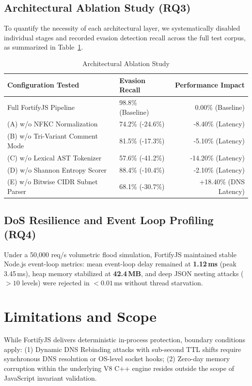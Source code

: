 \documentclass[conference]{IEEEtran}
\begin{document}
\subsection{Architectural Ablation Study (RQ3)}
To quantify the necessity of each architectural layer, we systematically disabled individual stages and recorded evasion detection recall across the full test corpus, as summarized in Table~\ref{tab:ablation}.

\begin{table}[htbp]
\caption{Architectural Ablation Study}
\label{tab:ablation}
\centering\footnotesize
\begin{tabular}{llr}
\toprule
\textbf{Configuration Tested} & \textbf{Evasion Recall} & \textbf{Performance Impact} \\
\midrule
Full FortifyJS Pipeline                & 98.8\% (Baseline) & 0.00\% (Baseline) \\
(A) w/o NFKC Normalization             & 74.2\% (-24.6\%)  & -8.40\% (Latency) \\
(B) w/o Tri-Variant Comment Mode       & 81.5\% (-17.3\%)  & -5.10\% (Latency) \\
(C) w/o Lexical AST Tokenizer          & 57.6\% (-41.2\%)  & -14.20\% (Latency) \\
(D) w/o Shannon Entropy Scorer         & 88.4\% (-10.4\%)  & -2.10\% (Latency) \\
(E) w/o Bitwise CIDR Subnet Parser     & 68.1\% (-30.7\%)  & +18.40\% (DNS Latency) \\
\bottomrule
\end{tabular}
\end{table}

\subsection{DoS Resilience and Event Loop Profiling (RQ4)}
Under a 50,000 req/s volumetric flood simulation, FortifyJS maintained stable Node.js event-loop metrics: mean event-loop delay remained at \textbf{1.12\,ms} (peak 3.45\,ms), heap memory stabilized at \textbf{42.4\,MB}, and deep JSON nesting attacks ($>10$ levels) were rejected in $<0.01$\,ms without thread starvation.

\section{Limitations and Scope}
While FortifyJS delivers deterministic in-process protection, boundary conditions apply: (1) Dynamic DNS Rebinding attacks with sub-second TTL shifts require synchronous DNS resolution or OS-level socket hooks; (2) Zero-day memory corruption within the underlying V8 C++ engine resides outside the scope of JavaScript invariant validation.
\end{document}
